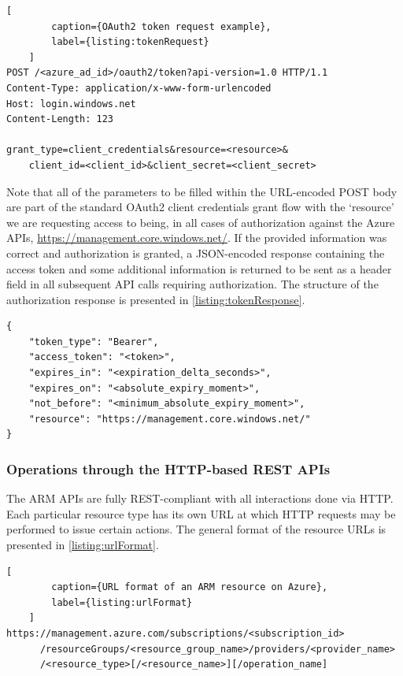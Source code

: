 \documentclass[11pt]{report}
\begin{document}
\begin{lstlisting}[
        caption={OAuth2 token request example},
        label={listing:tokenRequest}
    ]
POST /<azure_ad_id>/oauth2/token?api-version=1.0 HTTP/1.1
Content-Type: application/x-www-form-urlencoded
Host: login.windows.net
Content-Length: 123

grant_type=client_credentials&resource=<resource>&
    client_id=<client_id>&client_secret=<client_secret>
\end{lstlisting}

Note that all of the parameters to be filled within the URL-encoded POST body
are part of the standard OAuth2 client credentials grant flow with the
`resource' we are requesting access to being, in all cases of authorization
against the Azure APIs, \url{https://management.core.windows.net/}.
If the provided information was correct and authorization is granted,
a JSON-encoded response containing the access token and some
additional information is returned to be sent as a header field in all
subsequent API calls requiring authorization. The structure of the
authorization response is presented in \autoref{listing:tokenResponse}.

\begin{listing}[H]
\caption{Structure of token response.}
\label{listing:tokenResponse}
\begin{verbatim}
{
    "token_type": "Bearer",
    "access_token": "<token>",
    "expires_in": "<expiration_delta_seconds>",
    "expires_on": "<absolute_expiry_moment>",
    "not_before": "<minimum_absolute_expiry_moment>",
    "resource": "https://management.core.windows.net/"
}
\end{verbatim}
\end{listing}

\subsubsection{Operations through the HTTP-based REST APIs}

The ARM APIs are fully REST-compliant with all interactions done via HTTP\@. Each
particular resource type has its own URL at which HTTP requests may be
performed to issue certain actions. The general format of the resource URLs is
presented in \autoref{listing:urlFormat}.

\begin{lstlisting}[
        caption={URL format of an ARM resource on Azure},
        label={listing:urlFormat}
    ]
https://management.azure.com/subscriptions/<subscription_id>
      /resourceGroups/<resource_group_name>/providers/<provider_name>
      /<resource_type>[/<resource_name>][/operation_name]
\end{lstlisting}
\end{document}
